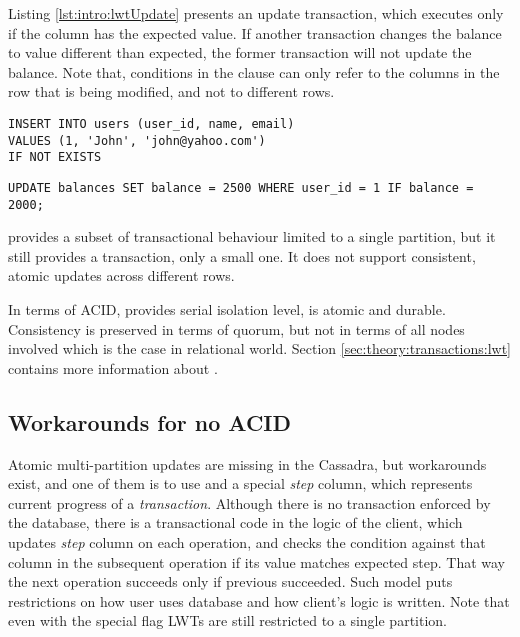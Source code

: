 Listing \ref{lst:intro:lwtUpdate} presents an update transaction, which executes only if the  column has the expected value. If another transaction changes the balance to value different than expected, the former transaction will not update the balance. Note that, conditions in the \lwt {} clause can only refer to the columns in the row that is being modified, and not to different rows.

\begin{example}
\label{lst:intro:lwtInsert}
\begin{lstlisting}[style=outcode,caption={LWT Insert with if not exists clause}]
INSERT INTO users (user_id, name, email)  
VALUES (1, 'John', 'john@yahoo.com') 
IF NOT EXISTS
\end{lstlisting}
\end{example}

\begin{example}
\label{lst:intro:lwtUpdate}
\begin{lstlisting}[style=outcode,caption={LWT Update with column condition}]
UPDATE balances SET balance = 2500 WHERE user_id = 1 IF balance = 2000;
\end{lstlisting}
\end{example}


\lwt provides a subset of transactional behaviour limited to a single partition, but it still provides a transaction, only a small one. It does not support consistent, atomic updates across different rows. 

In terms of ACID, \lwt provides serial isolation level, is atomic and durable.
Consistency is preserved in terms of quorum, but not in terms of all nodes involved which is the case in relational world. Section \ref{sec:theory:transactions:lwt} contains more information about \lwt.

\subsection{Workarounds for no ACID}
Atomic multi-partition updates are missing in the Cassadra, but workarounds exist, and one of them is to use \lwt and a special \emph{step} column, which represents current progress of a \emph{transaction}. Although there is no transaction enforced by the database, there is a transactional code in the logic of the client, which updates \emph{step} column on each operation, and checks the condition against that column in the subsequent operation if its value matches expected step. That way the next operation succeeds only if previous succeeded. Such model puts restrictions on how user uses database and how client's logic is written. Note that even with the special flag LWTs are still restricted to a single partition.  

